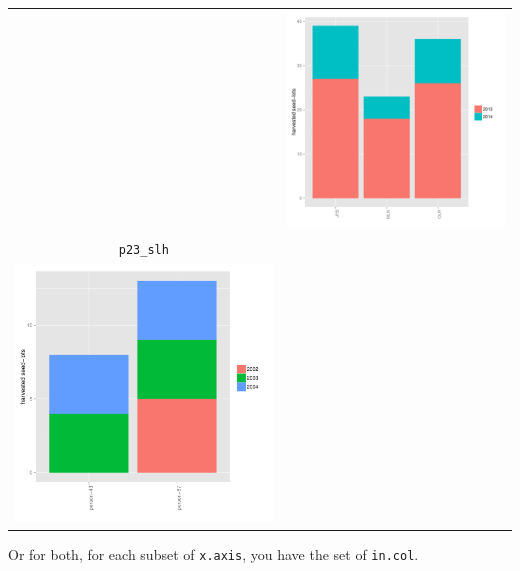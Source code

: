 \documentclass{article}\usepackage[]{graphicx}\usepackage[]{color}
\newenvironment{knitrout}{}{} %
\begin{document}
\begin{itemize}
\begin{center}
\begin{tabular}{cc}
\begin{knitrout}
{}



\end{knitrout}
&
\begin{knitrout}
\definecolor{shadecolor}{rgb}{0.969, 0.969, 0.969}\color{fgcolor}

{\centering \includegraphics[width=.4\textwidth]{figures/shinemas2R_unnamed-chunk-46-1} 

}



\end{knitrout}
\\
\texttt{p23\_slh} & \\
\begin{knitrout}
\definecolor{shadecolor}{rgb}{0.969, 0.969, 0.969}\color{fgcolor}

{\centering \includegraphics[width=.4\textwidth]{figures/shinemas2R_unnamed-chunk-47-1} 

}



\end{knitrout}
&
\\
\end{tabular}
\end{center}


Or for both, for each subset of \texttt{x.axis}, you have the set of \texttt{in.col}.

\end{itemize}
\end{document}
